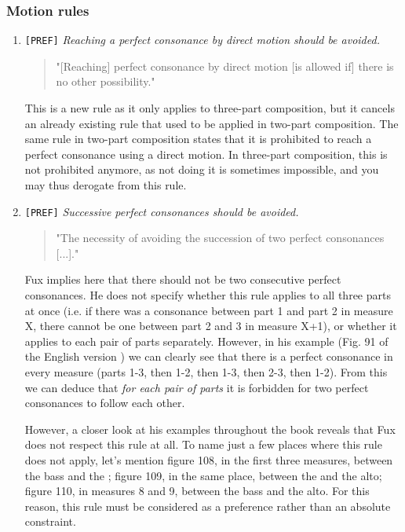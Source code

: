 \subsubsection{Motion rules}
\begin{enumerate}[wide, label=\bfseries 1.P\arabic*]
    \item\label{rule:direct-to-p-cons} \greendots \texttt{[PREF]}  \textit{Reaching a perfect consonance by direct motion should be avoided.}

    \begin{quotation}
    "[Reaching] perfect consonance by direct motion [is allowed if] there is no other possibility."
    \textcite[p.77]{GaPEng}
    \end{quotation}

    This is a new rule as it only applies to three-part composition, but it cancels an already existing rule that used to be applied in two-part composition. The same rule in two-part composition states that it is prohibited to reach a perfect consonance using a direct motion. In three-part composition, this is not prohibited anymore, as not doing it is sometimes impossible, and you may thus derogate from this rule.

\setcounter{enumi}{3} %
    \item\label{rule:succ-p-cons} \texttt{[PREF]} \textit{Successive perfect consonances should be avoided.}

    \begin{quotation}
    "The necessity of avoiding the succession of two perfect consonances [...]."
    \textcite[p.72]{GaPEng}
    \end{quotation}

    Fux implies here that there should not be two consecutive perfect consonances. He does not specify whether this rule applies to all three parts at once (i.e. if there was a consonance between part 1 and part 2 in measure X, there cannot be one between part 2 and 3 in measure X+1), or whether it applies to each pair of parts separately. However, in his example (Fig. 91 of the English version \cite{GaPEng}) we can clearly see that there is a perfect consonance in every measure (parts 1-3, then 1-2, then 1-3, then 2-3, then 1-2). From this we can deduce that \textit{for each pair of parts} it is forbidden for two perfect consonances to follow each other.

    However, a closer look at his examples throughout the book reveals that Fux does not respect this rule at all. To name just a few places where this rule does not apply, let's mention figure 108, in the first three measures, between the bass and the \cf; figure 109, in the same place, between the \cfs and the alto; figure 110, in measures 8 and 9, between the bass and the alto. For this reason, this rule must be considered as a preference rather than an absolute constraint.


\end{enumerate}
